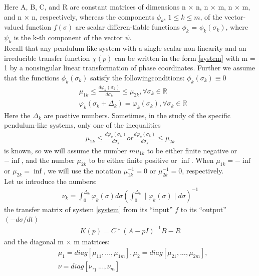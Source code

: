 \documentclass[a4paper,14pt]{extarticle} %
\begin{document}
Here A, B, C, and R are constant matrices of dimensions n × n, n × m, n × m, and n × n, respectively, whereas the components $\phi_k$, $1 \leq  k \leq m$, of the vector-valued function $f(\sigma)$ are scalar differen-tiable functions $\phi_k$ = $\phi_k(\sigma_k)$, where $\psi_k$ is the k-th component of the vector $\psi$.\\

Recall that any pendulum-like system with a single scalar non-linearity and an irreducible transfer function $\chi(p)$ can be written in the form \eqref{system} with m = 1 by a nonsingular linear transformation of phase coordinates. Further we assume that the functions $\phi_k(\sigma_k)$ satisfy the followingconditions: $\phi_k(\sigma_k) \equiv 0$\\
 \begin{equation}
 \begin{aligned}
&\mu_{1k} \leq \frac{d\varphi_k(\sigma_k)}{d\sigma_k} \leq \mu_{2k}, \forall \sigma_k \in \mathbb{R}\\
&\varphi_k(\sigma_k+\Delta_k) = \varphi_k(\sigma_k), \forall \sigma_k \in \mathbb{R}
 \end{aligned}
\end{equation}
Here the $\Delta_k$ are positive numbers. Sometimes, in the study of the specific pendulum-like systems, only one of the inequalities
 \begin{equation}
 \begin{aligned}
\mu_{1k} \leq \frac{d\varphi_k(\sigma_k)}{d\sigma_k}  or \frac{d\varphi_k(\sigma_k)}{d\sigma_k} \leq \mu_{2k}
 \end{aligned}
\end{equation}
is known, so we will assume the number $mu_{1k}$ to be either finite negative or $-\inf$, and the number $\mu_{2k}$ to be either finite positive or $\inf$.
When $\mu_{1k} = -\inf$ or $\mu_{2k} = \inf$, we will use the notation $\mu_{1k}^{-1} = 0$ or $\mu_{2k}^{-1} = 0$, respectively.\\

Let us introduce the numbers:
 \begin{equation}
 \begin{aligned}
\nu_k = \int_{0}^{\Delta_k} \varphi_k(\sigma) d\sigma (\int_{0}^{\Delta_k} \mid \varphi_k(\sigma) \mid d\sigma)^{-1}
 \end{aligned}
\end{equation}
the transfer matrix of system \eqref{system} from its “input” $f$ to its “output” $(-d\sigma/dt)$
 \begin{equation}
 \begin{aligned}
K(p) = C*(A - pI)^{-1}B - R
\end{aligned}
\end{equation}
and the diagonal m × m matrices:
 \begin{equation}
 \begin{aligned}
&\mu_1 = diag [\mu_{11}, . . . , \mu_{1m}],    \mu_2 = diag [\mu_{21}, . . . , \mu_{2m}],\\
&\nu = diag [\nu, _1. . . , \nu_m]
\end{aligned}
\end{equation}
\end{document}
